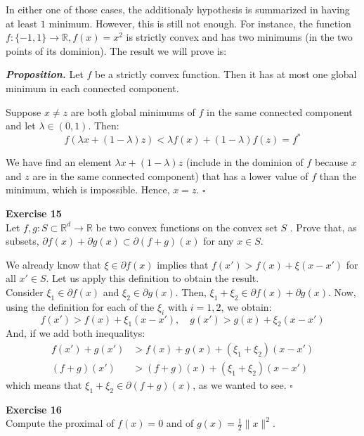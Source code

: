 \documentclass[11pt,table]{article}
\newcommand{\qed}{\hfill $\square$}
\newenvironment{problem}[2][Exercise]
{ \begin{mdframed}[backgroundcolor=gray!20] \textbf{#1 #2} \\}
	{  \end{mdframed}}
\newcommand\R{\mathbb R}
\begin{document}
In either one of those cases, the additionaly hypothesis is summarized in having at least $1$ minimum. However, this is still not enough. For instance, the function $f:\{-1,1\} \rightarrow \R, f(x) = x^2$ is strictly convex and has two minimums (in the two points of its dominion). The result we will prove is:

\emph{\textbf{Proposition.}} Let \( f \) be a strictly convex function. Then  it has at most one global minimum in each connected component.

Suppose $x \neq z$ are both global minimums of $f$ in the same connected component and let $\lambda \in (0,1)$. Then:
\[
	f(\lambda x + (1-\lambda)z) < \lambda f(x) + (1-\lambda) f(z) = f^*
\]

We have find an element $\lambda x + (1-\lambda)z$ (include in the dominion of $f$ because $x$ and $z$ are in the same connected component) that has a lower value of $f$ than the minimum, which is impossible. Hence, $x = z$. \qed \\

\begin{problem}{15}
Let \( f,g: S \subset \mathbb{R}^d \to \mathbb{R} \)  be two convex functions on the convex set \( S \) . Prove that, as subsets, \(  \partial f(x) + \partial g(x) \subset \partial(f+g)(x) \) for any $x\in S$.
\end{problem}

We already know that \(\xi \in \partial f(x)\) implies that \(f(x') > f(x) + \xi(x-x')\) for all \(x' \in S\). Let us apply this definition to obtain the result.\\
Consider \(\xi_1 \in \partial f(x)\) and \(\xi_2 \in \partial g(x)\). Then, \(\xi_1 + \xi_2 \in \partial f(x) + \partial g(x)\). Now, using the definition for each of the \(\xi_i\) with \(i = 1,2\), we obtain:
\[
	f(x') > f(x) + \xi_1 (x-x'), \quad g(x') > g(x) + \xi_2(x-x')
\]
And, if we add both inequalitys:
\begin{align*}
	f(x') + g(x')        & > f(x) + g(x) + (\xi_1 + \xi_2)(x-x')        \\
	\left(f+g\right)(x') & >\left(f+g\right)(x) + (\xi_1 + \xi_2)(x-x')
\end{align*}
which means that \(\xi_1 + \xi_2 \in \partial \left(f+g\right)(x) \), as we wanted to see. \qed \\

\begin{problem}{16}
Compute the proximal of \( f(x) = 0 \) and of \( g(x) = \frac{1}{2}\|x\|^2 \).
\end{problem}
\end{document}
